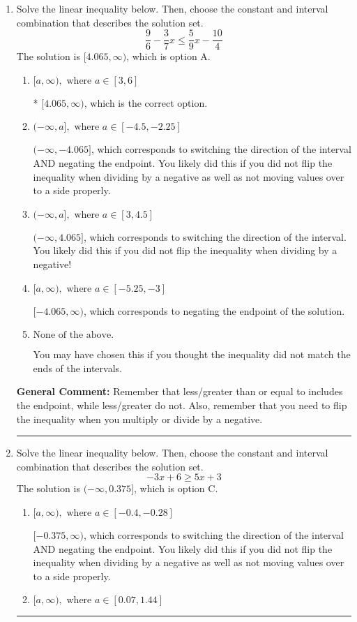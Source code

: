 \documentclass{extbook}[14pt]
\newcommand{\litem}[1]{\item #1

\rule{\textwidth}{0.4pt}}
\begin{document}
\begin{enumerate}\litem{
Solve the linear inequality below. Then, choose the constant and interval combination that describes the solution set.
\[ \frac{9}{6} - \frac{3}{7} x \leq \frac{5}{9} x - \frac{10}{4} \]The solution is \( [4.065, \infty) \), which is option A.\begin{enumerate}[label=\Alph*.]
\item \( [a, \infty), \text{ where } a \in [3, 6] \)

* $[4.065, \infty)$, which is the correct option.
\item \( (-\infty, a], \text{ where } a \in [-4.5, -2.25] \)

 $(-\infty, -4.065]$, which corresponds to switching the direction of the interval AND negating the endpoint. You likely did this if you did not flip the inequality when dividing by a negative as well as not moving values over to a side properly.
\item \( (-\infty, a], \text{ where } a \in [3, 4.5] \)

 $(-\infty, 4.065]$, which corresponds to switching the direction of the interval. You likely did this if you did not flip the inequality when dividing by a negative!
\item \( [a, \infty), \text{ where } a \in [-5.25, -3] \)

 $[-4.065, \infty)$, which corresponds to negating the endpoint of the solution.
\item \( \text{None of the above}. \)

You may have chosen this if you thought the inequality did not match the ends of the intervals.
\end{enumerate}

\textbf{General Comment:} Remember that less/greater than or equal to includes the endpoint, while less/greater do not. Also, remember that you need to flip the inequality when you multiply or divide by a negative.
}
\litem{
Solve the linear inequality below. Then, choose the constant and interval combination that describes the solution set.
\[ -3x + 6 \geq 5x + 3 \]The solution is \( (-\infty, 0.375] \), which is option C.\begin{enumerate}[label=\Alph*.]
\item \( [a, \infty), \text{ where } a \in [-0.4, -0.28] \)

 $[-0.375, \infty)$, which corresponds to switching the direction of the interval AND negating the endpoint. You likely did this if you did not flip the inequality when dividing by a negative as well as not moving values over to a side properly.
\item \( [a, \infty), \text{ where } a \in [0.07, 1.44] \)


\end{enumerate}}
\end{enumerate}
\end{document}
